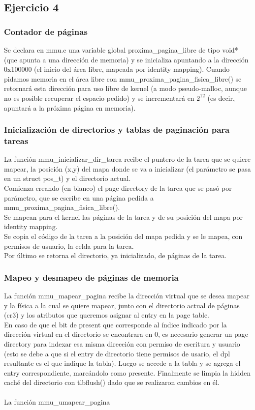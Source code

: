 \subsection{Ejercicio 4}

\subsubsection{Contador de páginas}
Se declara en mmu.c una variable global proxima_pagina_libre de tipo void* (que apunta a una dirección de memoria) y se inicializa apuntando a la dirección 0x100000 (el inicio del área libre, mapeada por identity mapping). Cuando pidamos memoria en el área libre con mmu_proxima_pagina_fisica_libre() se retornará esta dirección para uso libre de kernel (a modo pseudo-malloc, aunque no es posible recuperar el espacio pedido) y se incrementará en $2^{12}$ (es decir, apuntará a la próxima página en memoria). \\

\subsubsection{Inicialización de directorios y tablas de paginación para tareas}
La función mmu_inicializar_dir_tarea recibe el puntero de la tarea que se quiere mapear, la posición (x,y) del mapa donde se va a inicializar (el parámetro se pasa en un struct pos_t) y el directorio actual. \\
Comienza creando (en blanco) el page directory de la tarea que se pasó por parámetro, que se escribe en una página pedida a mmu_proxima_pagina_fisica_libre(). \\
Se mapean para el kernel las páginas de la tarea y de su posición del mapa por identity mapping.  \\
Se copia el código de la tarea a la posición del mapa pedida y se le mapea, con permisos de usuario, la celda para la tarea. \\
Por último se retorna el directorio, ya inicializado, de páginas de la tarea.

\subsubsection{Mapeo y desmapeo de páginas de memoria}
La función mmu_mapear_pagina recibe la dirección virtual que se desea mapear y la física a la cual se quiere mapear, junto con el directorio actual de páginas (cr3) y los atributos que queremos asignar al entry en la page table. \\
En caso de que el bit de present que corresponde al índice indicado por la dirección virtual en el directorio se encontrara en 0, es necesario generar un page directory para indexar esa misma dirección con permiso de escritura y usuario (esto se debe a que si el entry de directorio tiene permisos de usario, el dpl resultante es el que indique la tabla).
Luego se accede a la tabla y se agrega el entry correspondiente, marcándolo como presente. 
Finalmente se limpia la hidden caché del directorio con tlbflush() dado que se realizaron cambios en él.\\
\\
La función mmu_umapear_pagina